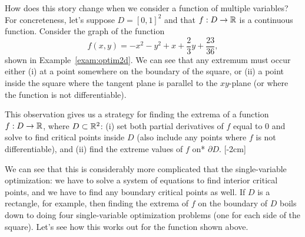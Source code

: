 \documentclass[svgnames]{watsonbook}
\begin{document}
How does this story change when we consider a function of multiple
variables? For concreteness, let's suppose $D = [0,1]^2$ and that
$f:D \to \mathbb{R}$ is a continuous function. Consider the graph of the
function
  \[
    f(x,y) = -x^2 - y^2 + x + \frac{2}{3} y + \frac{23}{36}, 
  \]
  shown in Example~\ref{exam:optim2d}. We can see that any extremum must
  occur either (i) at a point somewhere on the boundary of the square,
  or (ii) a point inside the square where the tangent plane is
  parallel to the $xy$-plane (or where the function is not
  differentiable).

  This observation gives us a strategy for finding the extrema of
  a function $f:D \to \mathbb{R}$, where $D \subset \mathbb{R}^2$: (i) set both
  partial derivatives of $f$ equal to 0 and solve to find critical
  points inside $D$ (also include any points where $f$ is not
  differentiable), and (ii) find the extreme values of $f$ on*
  $\partial D$. [-2cm]
  
  We can see that this is considerably more complicated that the
  single-variable optimization: we have to solve a system of equations
  to find interior critical points, and we have to find any boundary critical
  points as well. If $D$ is a rectangle, for example, then finding
  the extrema of $f$ on the boundary of $D$ boils down to doing four
  single-variable optimization problems (one for each side of the
  square). Let's see how this works out for the function shown above.
\end{document}

